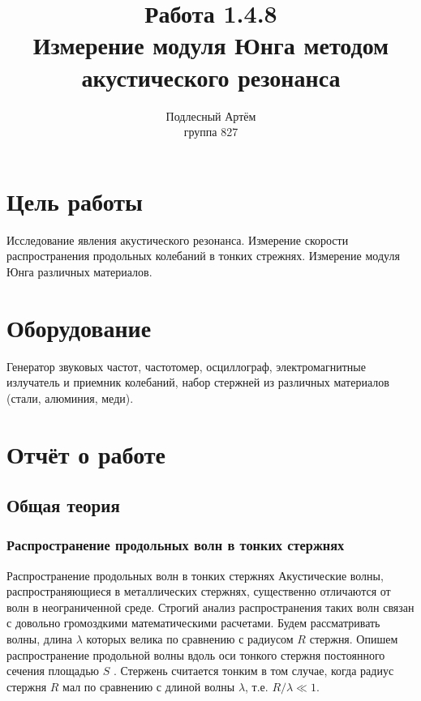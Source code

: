 \documentclass[a4paper, 12pt]{article}%
\author{Подлесный Артём \\ группа 827}
\title{Работа 1.4.8 \\ Измерение модуля Юнга методом 
акустического резонанса}
\begin{document}
\maketitle
\tableofcontents
\newpage
\section{Цель работы}
Исследование явления акустического резонанса. Измерение скорости
распространения продольных колебаний в тонких стрежнях. Измерение модуля Юнга различных материалов. 
\section{Оборудование}
Генератор звуковых частот, частотомер, осциллограф,
электромагнитные излучатель и приемник колебаний, набор стержней из различных материалов (стали, алюминия, меди).
\section{Отчёт о работе}
\subsection{Общая теория}
\subsubsection{Распространение продольных волн в тонких стержнях}
Распространение продольных волн в тонких стержнях 
Акустические волны, распространяющиеся в металлических стержнях,
существенно отличаются от волн в неограниченной среде. Строгий анализ
распространения таких волн связан с довольно громоздкими математическими
расчетами. Будем рассматривать волны, длина $\lambda$ которых велика по
сравнению с радиусом $R$ стержня. Опишем распространение продольной
волны вдоль оси тонкого стержня постоянного сечения площадью $S$ .
Стержень считается тонким в том случае, когда радиус стержня $R$ мал по
сравнению с длиной волны $\lambda$, т.е. $R/\lambda\ll 1$.
\end{document}
